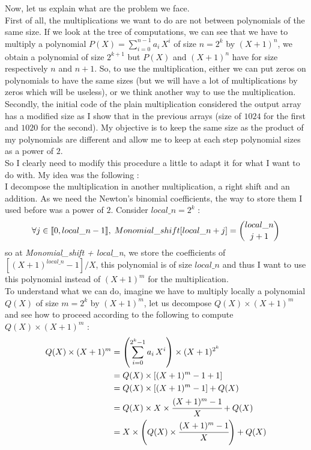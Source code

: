 Now, let us explain what are the problem we face. \\

First of all, the multiplications we want to do are not between polynomials of the same size. If we look at the tree of computations, we can see that we have to multiply a polynomial $P(X)=\sum_{i=0}^{n-1} a_i\,X^i$ of size $n=2^k$ by $(X+1)^n$, we obtain a polynomial of size $2^{k+1}$ but $P(X)$ and $(X+1)^n$ have for size respectively $n$ and $n+1$. So, to use the multiplication, either we can put zeros on polynomials to have the same sizes (but we will have a lot of multiplications by zeros which will be useless), or we think another way to use the multiplication. \\

Secondly, the initial code of the plain multiplication considered the output array has a modified size as I show that in the previous arrays (size of $1024$ for the first and $1020$ for the second). My objective is to keep the same size as the product of my polynomials are different and allow me to keep at each step polynomial sizes as a power of $2$.\\

So I clearly need to modify this procedure a little to adapt it for what I want to do with. My idea was the following :\\

I decompose the multiplication in another multiplication, a right shift and an addition. As we need the Newton's binomial coefficients, the way to store them I used before was a power of $2$. Consider $local\_n = 2^k$ : $$\forall j\in \mbox{\textlbrackdbl} 0, local\_n - 1\mbox{\textrbrackdbl},\; Monomial\_shift[local\_n + j] = {local\_n \choose j + 1}$$
so at \textit{Monomial\_shift + local\_n}, we store the coefficients of $[(X+1)^{local\_n} - 1]/X$, this polynomial is of size $local\_n$ and thus I want to use this polynomial instead of $(X+1)^m$ for the multiplication. \\

To understand what we can do, imagine we have to multiply locally a polynomial $Q(X)$ of size $m=2^k$ by $(X+1)^{m}$, let us decompose $Q(X) \times (X+1)^{m} 
$ and see how to proceed according to the following to compute $Q(X) \times (X+1)^{m}$ :\\

\begin{align*}
Q(X) \times (X+1)^{m} 
&= \left( \sum_{i=0}^{2^k-1} a_i\,X^i\right) \times (X+1)^{2^k}\\
&= Q(X) \times \left[(X+1)^{m} - 1 + 1 \right]\\
&= Q(X) \times \left[(X+1)^{m} - 1\right] + Q(X)\\
&= Q(X) \times X \times \cfrac{(X+1)^{m} - 1}{X} + Q(X)\\
&= X \times \left( Q(X) \times \cfrac{(X+1)^{m} - 1}{X} \right) + Q(X)
\end{align*}\\

